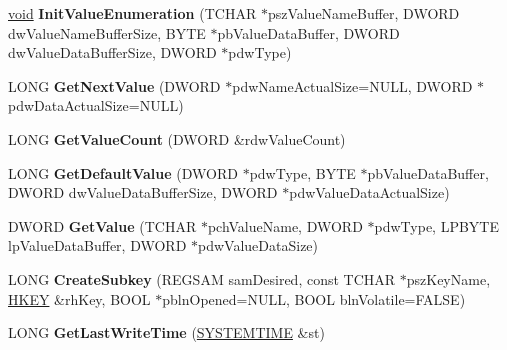 \begin{DoxyCompactItemize}
\mbox{\label{class_c_registry_key_a80079bee698f91262d78baedc5798fa4}} 
\hyperlink{interfacevoid}{void} {\bfseries Init\+Value\+Enumeration} (T\+C\+H\+AR $\ast$psz\+Value\+Name\+Buffer, D\+W\+O\+RD dw\+Value\+Name\+Buffer\+Size, B\+Y\+TE $\ast$pb\+Value\+Data\+Buffer, D\+W\+O\+RD dw\+Value\+Data\+Buffer\+Size, D\+W\+O\+RD $\ast$pdw\+Type)
\item 
\mbox{\label{class_c_registry_key_a00f87e314648308ff9238fd573a47505}} 
L\+O\+NG {\bfseries Get\+Next\+Value} (D\+W\+O\+RD $\ast$pdw\+Name\+Actual\+Size=N\+U\+LL, D\+W\+O\+RD $\ast$pdw\+Data\+Actual\+Size=N\+U\+LL)
\item 
\mbox{\label{class_c_registry_key_a2fb7f65a8d6639d5da12eb6983ca8158}} 
L\+O\+NG {\bfseries Get\+Value\+Count} (D\+W\+O\+RD \&rdw\+Value\+Count)
\item 
\mbox{\label{class_c_registry_key_ae90aed7ab2934d65b8889d336424217b}} 
L\+O\+NG {\bfseries Get\+Default\+Value} (D\+W\+O\+RD $\ast$pdw\+Type, B\+Y\+TE $\ast$pb\+Value\+Data\+Buffer, D\+W\+O\+RD dw\+Value\+Data\+Buffer\+Size, D\+W\+O\+RD $\ast$pdw\+Value\+Data\+Actual\+Size)
\item 
\mbox{\label{class_c_registry_key_a7d1a9e0b4b24996b955318f8e9219ab1}} 
D\+W\+O\+RD {\bfseries Get\+Value} (T\+C\+H\+AR $\ast$pch\+Value\+Name, D\+W\+O\+RD $\ast$pdw\+Type, L\+P\+B\+Y\+TE lp\+Value\+Data\+Buffer, D\+W\+O\+RD $\ast$pdw\+Value\+Data\+Size)
\item 
\mbox{\label{class_c_registry_key_ad604934484eb5a316d849be2090b0da1}} 
L\+O\+NG {\bfseries Create\+Subkey} (R\+E\+G\+S\+AM sam\+Desired, const T\+C\+H\+AR $\ast$psz\+Key\+Name, \hyperlink{interfacevoid}{H\+K\+EY} \&rh\+Key, B\+O\+OL $\ast$pbln\+Opened=N\+U\+LL, B\+O\+OL bln\+Volatile=F\+A\+L\+SE)
\item 
\mbox{\label{class_c_registry_key_aa25c159545f6f8832dad8ba6670c4ce7}} 
L\+O\+NG {\bfseries Get\+Last\+Write\+Time} (\hyperlink{struct___s_y_s_t_e_m_t_i_m_e}{S\+Y\+S\+T\+E\+M\+T\+I\+ME} \&st)
\item 
\mbox{\label{class_c_registry_key_a69161e80c82b7af1ac946d40dadddea1}} 

\end{DoxyCompactItemize}
